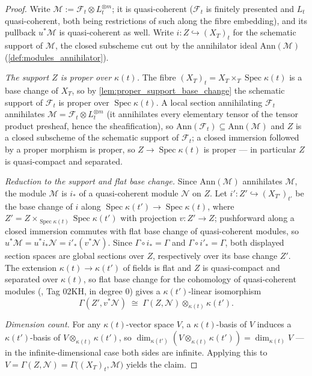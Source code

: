 \begin{proof}
  Write \(\mathcal{M} := \mathcal{F}_t \otimes L_t^{\otimes m}\); it is
  quasi-coherent (\(\mathcal{F}_t\) is finitely presented and \(L_t\)
  quasi-coherent, both being restrictions of such along the fibre
  embedding), and its pullback \(u^*\mathcal{M}\) is quasi-coherent as well.
  Write \(i : Z \hookrightarrow (X_T)_t\) for the schematic support of
  \(\mathcal{M}\), the closed subscheme cut out by the annihilator ideal
  \(\mathrm{Ann}(\mathcal{M})\) (\cref{def:modules_annihilator}).

  \emph{The support \(Z\) is proper over \(\kappa(t)\).}  The fibre
  \((X_T)_t = X_T \times_T \operatorname{Spec} \kappa(t)\) is a base change
  of \(X_T\), so by \cref{lem:proper_support_base_change} the schematic
  support of \(\mathcal{F}_t\) is proper over
  \(\operatorname{Spec} \kappa(t)\).  A local section annihilating
  \(\mathcal{F}_t\) annihilates \(\mathcal{M} = \mathcal{F}_t \otimes
  L_t^{\otimes m}\) (it annihilates every elementary tensor of the tensor
  product presheaf, hence the sheafification), so
  \(\mathrm{Ann}(\mathcal{F}_t) \subseteq \mathrm{Ann}(\mathcal{M})\) and
  \(Z\) is a closed subscheme of the schematic support of
  \(\mathcal{F}_t\); a closed immersion followed by a proper morphism is
  proper, so \(Z \to \operatorname{Spec} \kappa(t)\) is proper — in
  particular \(Z\) is quasi-compact and separated.

  \emph{Reduction to the support and flat base change.}  Since
  \(\mathrm{Ann}(\mathcal{M})\) annihilates \(\mathcal{M}\), the module
  \(\mathcal{M}\) is \(i_*\) of a quasi-coherent module \(\mathcal{N}\) on
  \(Z\).  Let \(i' : Z' \hookrightarrow (X_{T'})_{t'}\) be the base change of
  \(i\) along \(\operatorname{Spec} \kappa(t') \to
  \operatorname{Spec} \kappa(t)\), where
  \(Z' = Z \times_{\operatorname{Spec} \kappa(t)}
  \operatorname{Spec} \kappa(t')\) with projection \(v : Z' \to Z\);
  pushforward along a closed immersion commutes with flat base change of
  quasi-coherent modules, so \(u^*\mathcal{M} = u^* i_* \mathcal{N} =
  i'_* (v^* \mathcal{N})\).  Since \(\Gamma \circ i_* = \Gamma\) and
  \(\Gamma \circ i'_* = \Gamma\), both displayed section spaces are global
  sections over \(Z\), respectively over its base change \(Z'\).  The
  extension \(\kappa(t) \to \kappa(t')\) of fields is flat and \(Z\) is
  quasi-compact and separated over \(\kappa(t)\), so flat base change for
  the cohomology of quasi-coherent modules (\cite{stacks-project}, Tag 02KH, in
  degree \(0\)) gives a \(\kappa(t')\)-linear isomorphism
  \[
    \Gamma(Z', v^*\mathcal{N})
    \;\cong\;
    \Gamma(Z, \mathcal{N}) \otimes_{\kappa(t)} \kappa(t').
  \]

  \emph{Dimension count.}  For any \(\kappa(t)\)-vector space \(V\), a
  \(\kappa(t)\)-basis of \(V\) induces a \(\kappa(t')\)-basis of
  \(V \otimes_{\kappa(t)} \kappa(t')\), so
  \(\dim_{\kappa(t')}(V \otimes_{\kappa(t)} \kappa(t')) =
  \dim_{\kappa(t)} V\) — in the infinite-dimensional case both sides are
  infinite.  Applying this to \(V = \Gamma(Z, \mathcal{N}) =
  \Gamma\bigl((X_T)_t, \mathcal{M}\bigr)\) yields the claim.
\end{proof}

